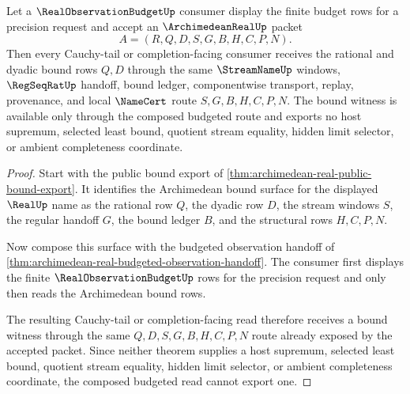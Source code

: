 \begin{theorem}
\label{thm:archimedean-real-budgeted-cauchy-bound}
Let a $\RealObservationBudgetUp$ consumer display the finite budget rows for a precision request and accept an $\ArchimedeanRealUp$ packet
$$
A=(R,Q,D,S,G,B,H,C,P,N).
$$
Then every Cauchy-tail or completion-facing consumer receives the rational and dyadic bound rows $Q,D$ through the same $\StreamNameUp$ windows, $\RegSeqRatUp$ handoff, bound ledger, componentwise transport, replay, provenance, and local $\NameCert$ route $S,G,B,H,C,P,N$. The bound witness is available only through the composed budgeted route and exports no host supremum, selected least bound, quotient stream equality, hidden limit selector, or ambient completeness coordinate.
\end{theorem}
\begin{proof}
Start with the public bound export of \autoref{thm:archimedean-real-public-bound-export}. It identifies the Archimedean bound surface for the displayed $\RealUp$ name as the rational row $Q$, the dyadic row $D$, the stream windows $S$, the regular handoff $G$, the bound ledger $B$, and the structural rows $H,C,P,N$.

Now compose this surface with the budgeted observation handoff of \autoref{thm:archimedean-real-budgeted-observation-handoff}. The consumer first displays the finite $\RealObservationBudgetUp$ rows for the precision request and only then reads the Archimedean bound rows.

The resulting Cauchy-tail or completion-facing read therefore receives a bound witness through the same $Q,D,S,G,B,H,C,P,N$ route already exposed by the accepted packet. Since neither theorem supplies a host supremum, selected least bound, quotient stream equality, hidden limit selector, or ambient completeness coordinate, the composed budgeted read cannot export one.
\end{proof}


